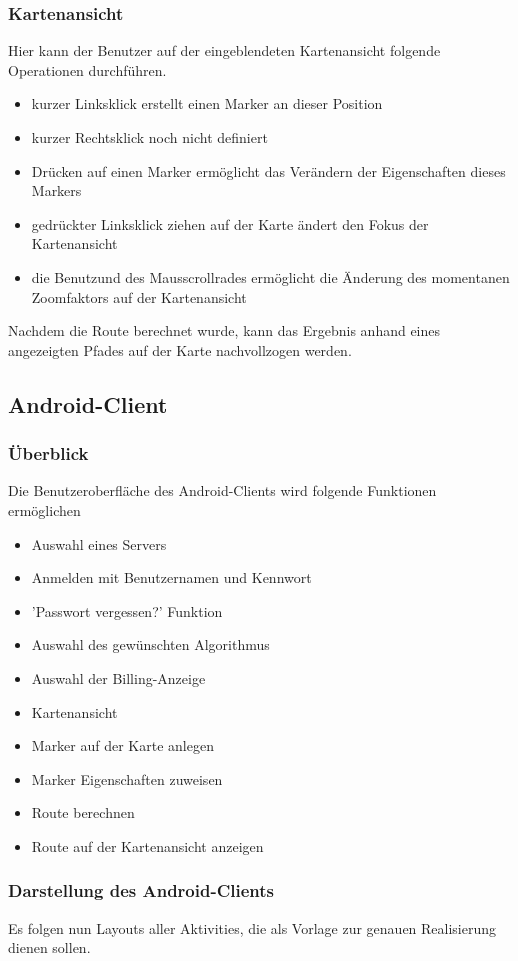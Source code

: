 \documentclass[a4paper,10pt,titlepage]{article}
\begin{document}
\subsubsection{Kartenansicht}
Hier kann der Benutzer auf der eingeblendeten Kartenansicht folgende Operationen durchführen.
\begin {itemize}
\item kurzer Linksklick erstellt einen Marker an dieser Position 
\item kurzer Rechtsklick noch nicht definiert
\item Drücken auf einen Marker ermöglicht das Verändern der Eigenschaften dieses Markers
\item gedrückter Linksklick ziehen auf der Karte ändert den Fokus der Kartenansicht
\item die Benutzund des Mausscrollrades ermöglicht die Änderung des momentanen Zoomfaktors auf der Kartenansicht 
\end {itemize}
Nachdem die Route berechnet wurde, kann das Ergebnis anhand eines angezeigten Pfades auf der Karte nachvollzogen werden.

\newpage
\subsection{Android-Client}
\subsubsection{Überblick}
Die Benutzeroberfläche des Android-Clients wird folgende Funktionen ermöglichen
\begin{itemize}
\item Auswahl eines Servers
\item Anmelden mit Benutzernamen und Kennwort
\item 'Passwort vergessen?' Funktion
\item Auswahl des gewünschten Algorithmus
\item Auswahl der Billing-Anzeige 
\item Kartenansicht
\item Marker auf der Karte anlegen
\item Marker Eigenschaften zuweisen
\item Route berechnen
\item Route auf der Kartenansicht anzeigen
\end{itemize}
\subsubsection{Darstellung des Android-Clients}
Es folgen nun Layouts aller Aktivities, die als Vorlage zur genauen Realisierung dienen sollen.
\end{document}
